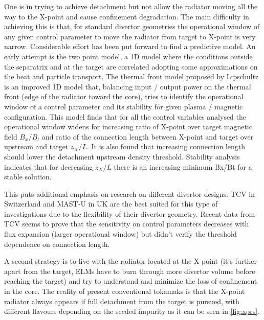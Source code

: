 One is in trying to achieve detachment but not allow the radiator moving all the way to the X-point and cause confinement degradation. The main difficulty in achieving this is that, for standard divertor geometries the operational window of any given control parameter to move the radiator from target to X-point is very narrow. Considerable effort has been put forward to find a predictive model. An early attempt is the two point model, a 1D model where the conditions outside the separatrix and at the target are correlated adopting some approximations on the heat and particle transport.\cite{HOBBS1966,Hobbs1967,Mahdavi1981,Keilhacker1982,Harbour1984,Lackner1984,Stangeby2001} The thermal front model proposed by Lipschultz \cite{Lipschultz2016} is an improved 1D model that, balancing input / output power on the thermal front (edge of the radiator toward the core), tries to identify the operational window of a control parameter and its stability for given plasma / magnetic configuration. This model finds that for all the control variables analysed the operational window widens for increasing ratio of X-point over target magnetic field $B_x/B_t$ and ratio of the connection length between X-point and target over upstream and target $z_X/L$. It is also found that increasing connection length should lower the detachment upstream density threshold. Stability analysis indicates that for decreasing $z_X/L$ there is an increasing minimum Bx/Bt for a stable solution.\cite{Lipschultz2016}

This puts additional emphasis on research on different divertor designs. TCV in Switzerland and MAST-U in UK are the best suited for this type of investigations due to the flexibility of their divertor geometry. Recent data from TCV seems to prove that the sensitivity on control parameters decreases with flux expansion (larger operational window) but didn’t verify the threshold dependence on connection length. \cite{Theiler2017}

A second strategy is to live with the radiator located at the X-point (it’s further apart from the target, ELMs have to burn through more divertor volume before reaching the target) and try to understand and minimize the loss of confinement in the core. The reality of present conventional tokamaks is that the X-point radiator always appears if full detachment from the target is pursued, with different flavours depending on the seeded impurity as it can be seen in \autoref{fig:xprs}.

